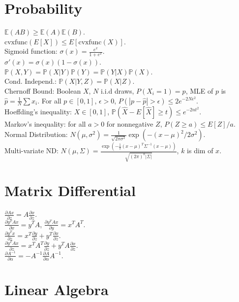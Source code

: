 \section{Probability}

$\mathbb{E}(AB) \geq \mathbb{E}(A)\mathbb{E}(B)$.\\
$\text{cvxfunc}(E[X]) \leq E[\text{cvxfunc}(X)]$.\\
Sigmoid function: $\sigma(x) = \frac{e^x}{1+e^x}$.\\
$\sigma'(x) = \sigma(x)(1-\sigma(x))$.\\
$\mathbb{P}(X, Y) = \mathbb{P}(X|Y)\mathbb{P}(Y) = \mathbb{P}(Y|X)\mathbb{P}(X)$.\\
Cond. Independ.: $\mathbb{P}(X|Y, Z) = \mathbb{P}(X|Z)$.\\
Chernoff Bound: Boolean $X$, $N$ i.i.d draws, $P(X_i=1)=p$, MLE of $p$ is $\hat{p}=\frac{1}{N}\sum x_i$. For all $p \in [0, 1]$, $\epsilon > 0$, $P(|p-\hat{p}| > \epsilon) \leq 2e^{-2N\epsilon^2}$.\\
Hoeffding's inequality: $X \in [0, 1]$, $\mathbb{P}(\hat{X} - E[\hat{X}] \geq t) \leq e^{-2nt^2}$.\\
Markov's inequality: for all $a > 0$ for nonnegative $Z$, $P(Z \geq a) \leq E[Z]/a$.\\
Normal Distribution: $N(\mu, \sigma^2) = \frac{1}{\sqrt{2 \pi \sigma^2}}\exp(-(x-\mu)^2/2\sigma^2)$.\\
Multi-variate ND: $N(\mu, \Sigma) = \frac{\exp(-\frac{1}{2}(x-\mu)^T\Sigma^{-1}(x-\mu))}{\sqrt{(2\pi)^k |\Sigma|}}$, $k$ is dim of $x$.

\section{Matrix Differential}

$\frac{\partial Ax}{\partial z} = A\frac{\partial x}{\partial z}$.\\
$\frac{\partial y^T A x}{\partial x} = y^T A$, $\frac{\partial y^T A x}{\partial y} = x^T A^T$.\\
$\frac{\partial y^T x}{\partial z} = x^T\frac{\partial y}{\partial z} + y^T \frac{\partial x}{\partial z}$.\\
$\frac{\partial y^T A x}{\partial z} = x^T A^T \frac{\partial y}{\partial z} + y^T A\frac{\partial x}{\partial z}$.\\
$\frac{\partial A^{-1}}{\partial \alpha} = -A^{-1}\frac{\partial A}{\partial \alpha} A^{-1}$.

\section{Linear Algebra}

